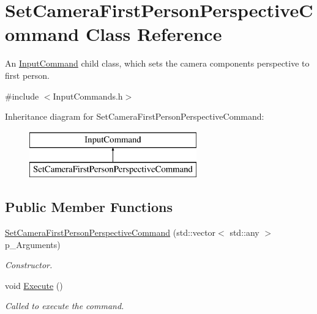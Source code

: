 \hypertarget{class_set_camera_first_person_perspective_command}{}\section{Set\+Camera\+First\+Person\+Perspective\+Command Class Reference}
\label{class_set_camera_first_person_perspective_command}


An \mbox{\hyperlink{class_input_command}{Input\+Command}} child class, which sets the camera component\textquotesingle{}s perspective to first person.  




{\ttfamily \#include $<$Input\+Commands.\+h$>$}

Inheritance diagram for Set\+Camera\+First\+Person\+Perspective\+Command\+:\begin{figure}[H]
\begin{center}
\leavevmode
\includegraphics[height=2.000000cm]{class_set_camera_first_person_perspective_command}
\end{center}
\end{figure}
\subsection*{Public Member Functions}
\begin{DoxyCompactItemize}
\item 
\mbox{\hyperlink{class_set_camera_first_person_perspective_command_a278372b4ebf2e69db0cfee369ef5f024}{Set\+Camera\+First\+Person\+Perspective\+Command}} (std\+::vector$<$ std\+::any $>$ p\+\_\+\+Arguments)
\begin{DoxyCompactList}\small\item\em Constructor. \end{DoxyCompactList}\item 
\mbox{\label{class_set_camera_first_person_perspective_command_a9eb31e2d243e37d667fc461ad1a81a6b}} 
void \mbox{\hyperlink{class_set_camera_first_person_perspective_command_a9eb31e2d243e37d667fc461ad1a81a6b}{Execute}} ()
\begin{DoxyCompactList}\small\item\em Called to execute the command. \end{DoxyCompactList}\end{DoxyCompactItemize}
